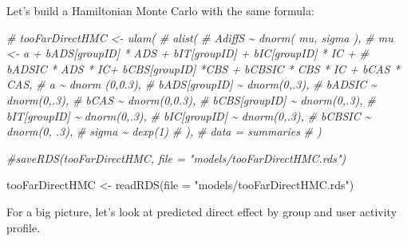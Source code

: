 \documentclass[
  10pt,
  dvipsnames,enabledeprecatedfontcommands]{scrartcl}
\newenvironment{Shaded}{\begin{snugshade}}{\end{snugshade}}
\newcommand{\AttributeTok}[1]{\textcolor[rgb]{0.77,0.63,0.00}{#1}}
\newcommand{\CommentTok}[1]{\textcolor[rgb]{0.56,0.35,0.01}{\textit{#1}}}
\newcommand{\FunctionTok}[1]{\textcolor[rgb]{0.00,0.00,0.00}{#1}}
\newcommand{\NormalTok}[1]{#1}
\newcommand{\OtherTok}[1]{\textcolor[rgb]{0.56,0.35,0.01}{#1}}
\newcommand{\StringTok}[1]{\textcolor[rgb]{0.31,0.60,0.02}{#1}}
\begin{document}
Let's build a Hamiltonian Monte Carlo with the same formula:

\vspace{1mm}
\footnotesize

\begin{Shaded}
\begin{Highlighting}[]
\CommentTok{\# tooFarDirectHMC \textless{}{-} ulam(}
\CommentTok{\#   alist(}
\CommentTok{\#     AdiffS \textasciitilde{} dnorm( mu, sigma ),}
\CommentTok{\#     mu \textless{}{-} a + bADS[groupID] * ADS +  bIT[groupID] + bIC[groupID] * IC + }
\CommentTok{\#       bADSIC * ADS * IC+ bCBS[groupID] *CBS + bCBSIC * CBS * IC + bCAS * CAS, }
\CommentTok{\#     a \textasciitilde{} dnorm (0,0.3),}
\CommentTok{\#     bADS[groupID] \textasciitilde{} dnorm(0,.3),}
\CommentTok{\#     bADSIC \textasciitilde{} dnorm(0,.3),}
\CommentTok{\#     bCAS \textasciitilde{} dnorm(0,0.3),}
\CommentTok{\#     bCBS[groupID] \textasciitilde{} dnorm(0,.3),}
\CommentTok{\#     bIT[groupID] \textasciitilde{} dnorm(0,.3),}
\CommentTok{\#     bIC[groupID] \textasciitilde{} dnorm(0,.3),}
\CommentTok{\#     bCBSIC \textasciitilde{} dnorm(0, .3),}
\CommentTok{\#     sigma  \textasciitilde{} dexp(1)}
\CommentTok{\#   ), }
\CommentTok{\#   data = summaries}
\CommentTok{\# )}


\CommentTok{\#saveRDS(tooFarDirectHMC, file = "models/tooFarDirectHMC.rds")}

\NormalTok{tooFarDirectHMC }\OtherTok{\textless{}{-}} \FunctionTok{readRDS}\NormalTok{(}\AttributeTok{file =} \StringTok{"models/tooFarDirectHMC.rds"}\NormalTok{)}
\end{Highlighting}
\end{Shaded}

\normalsize

For a big picture, let's look at predicted direct effect by group and
user activity profile.

\vspace{1mm}
\footnotesize
\end{document}

